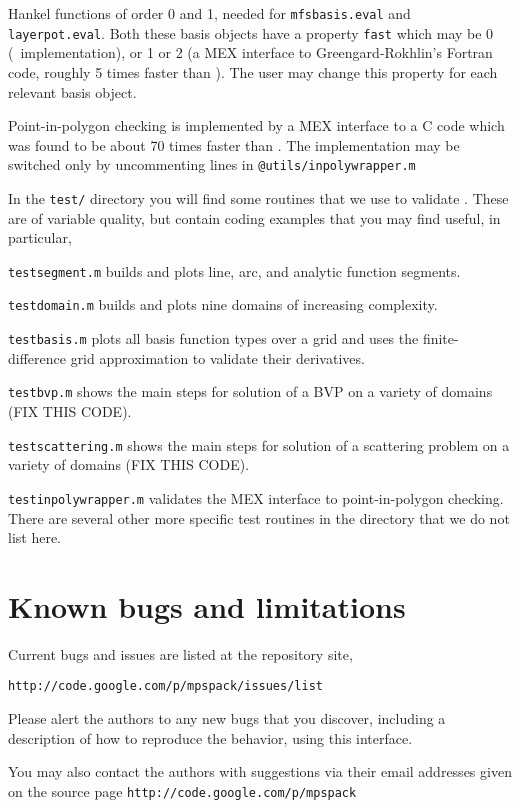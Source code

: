 \documentclass[12pt]{article}
\begin{document}
\item Hankel functions of order 0 and 1, needed for
{\tt mfsbasis.eval} and {\tt layerpot.eval}. Both these basis objects
have a property {\tt fast} which may be 0 (\matlab\ implementation),
or 1 or 2 (a MEX interface to Greengard-Rokhlin's Fortran code,
roughly 5 times faster than \matlab).
The user may change this property for each relevant basis object.

\item Point-in-polygon checking is implemented by a MEX interface
to a C code which was found to be about 70 times faster than
\matlab. The implementation
may be switched only by uncommenting lines
in {\tt @utils/inpolywrapper.m}
\een

In the {\tt test/} directory you will find some routines that
we use to validate \mpspack. These are of variable quality,
but contain coding examples that you may find useful, in particular,
\bi
\item {\tt testsegment.m} builds and plots line, arc, and analytic function
segments.
\item {\tt testdomain.m} builds and plots nine domains of increasing
complexity.
\item {\tt testbasis.m} plots all basis function types over a grid and
uses the finite-difference grid approximation to validate their derivatives.
\item {\tt testbvp.m} shows the main steps for solution of a BVP on
a variety of domains (FIX THIS CODE).
\item {\tt testscattering.m} shows the main steps for solution of a 
scattering problem on a variety of domains (FIX THIS CODE).
\item {\tt testinpolywrapper.m} validates the MEX interface to point-in-polygon
checking.
\ei
There are several other more specific test routines in the directory
that we do not list here.

\section{Known bugs and limitations}

Current bugs and issues are listed at the repository site,

{\tt http://code.google.com/p/mpspack/issues/list}

Please alert the authors to any new
bugs that you discover, including a description
of how to reproduce the behavior, using this interface.

You may also contact the authors with suggestions
via their email addresses
given on the source page {\tt http://code.google.com/p/mpspack}
\end{document}

